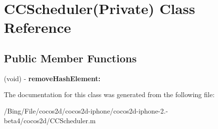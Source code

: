 \hypertarget{interface_c_c_scheduler_07_private_08}{\section{C\-C\-Scheduler(Private) Class Reference}
\label{interface_c_c_scheduler_07_private_08}
}
\subsection*{Public Member Functions}
\begin{DoxyCompactItemize}
\item 
\hypertarget{interface_c_c_scheduler_07_private_08_a222c17a051008b4b1e5c1486054d3bf4}{(void) -\/ {\bfseries remove\-Hash\-Element\-:}}\label{interface_c_c_scheduler_07_private_08_a222c17a051008b4b1e5c1486054d3bf4}

\end{DoxyCompactItemize}


The documentation for this class was generated from the following file\-:\begin{DoxyCompactItemize}
\item 
/\-Bing/\-File/cocos2d/cocos2d-\/iphone/cocos2d-\/iphone-\/2.-\/beta4/cocos2d/C\-C\-Scheduler.\-m\end{DoxyCompactItemize}
